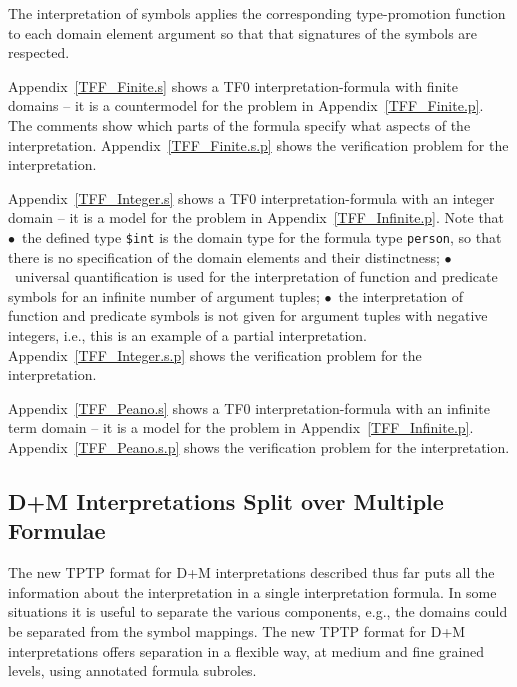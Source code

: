 \documentclass{easychair}
\newcommand{\smalltt}[1]{\small \texttt{#1}}
\newenvironment{packed_itemize}{
\vspace*{-0.2em}
\begin{itemize}
\setlength{\partopsep}{0pt}
\setlength{\itemsep}{1pt}
\setlength{\parskip}{0pt}
\setlength{\parsep}{0pt}
}{\end{itemize}}
\begin{document}
The interpretation of symbols applies the corresponding type-promotion function to each domain
element argument so that that signatures of the symbols are respected.

\begin{packed_itemize}
\item Appendix~\ref{TFF_Finite.s} shows a TF0 interpretation-formula with finite domains -- it is a 
      countermodel for the problem in Appendix~\ref{TFF_Finite.p}.
      The comments show which parts of the formula specify what aspects of the interpretation.
      Appendix~\ref{TFF_Finite.s.p} shows the verification problem for the interpretation.
\item Appendix~\ref{TFF_Integer.s} shows a TF0 interpretation-formula with an integer domain -- it 
      is a model for the problem in Appendix~\ref{TFF_Infinite.p}.
      Note that $\bullet$~the defined type {\smalltt{\$int}} is the domain type for the formula 
      type {\smalltt{person}}, so that there is no specification of the domain elements and their 
      distinctness; $\bullet$~universal quantification is used for the interpretation of function 
      and predicate symbols for an infinite number of argument tuples; $\bullet$~the 
      interpretation of function and predicate symbols is not given for argument tuples with 
      negative integers, i.e., this is an example of a partial interpretation.
      Appendix~\ref{TFF_Integer.s.p} shows the verification problem for the interpretation.
\item Appendix~\ref{TFF_Peano.s} shows a TF0 interpretation-formula with an infinite term domain 
      -- it is a model for the problem in Appendix~\ref{TFF_Infinite.p}.
      Appendix~\ref{TFF_Peano.s.p} shows the verification problem for the interpretation.
\end{packed_itemize}

\subsection{{\sf D+M} Interpretations Split over Multiple Formulae}
\label{NewTarskianSplit}

The new TPTP format for {\sf D+M} interpretations described thus far puts all the information 
about the interpretation in a single interpretation formula.
In some situations it is useful to separate the various components, e.g., the domains could be
separated from the symbol mappings.
The new TPTP format for {\sf D+M} interpretations offers separation in a flexible way, at medium
and fine grained levels, using annotated formula subroles.
\end{document}
